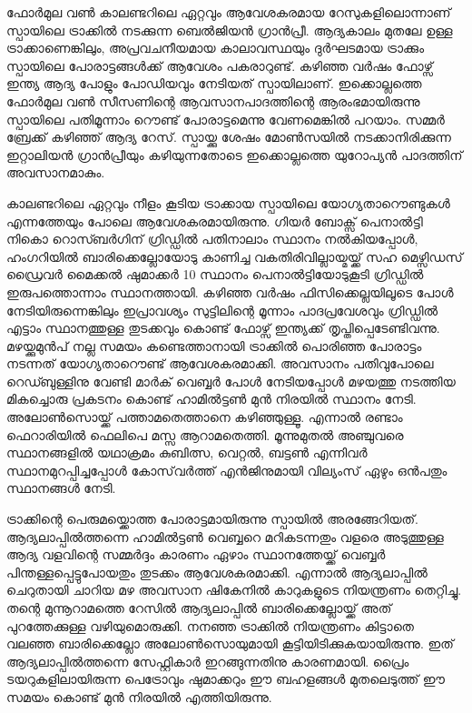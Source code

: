 \vskip 2pt

ഫോര്‍മുല വണ്‍ കാലണ്ടറിലെ ഏറ്റവും ആവേശകരമായ റേസുകളിലൊന്നാണ് സ്പായിലെ ട്രാക്കില്‍ നടക്കുന്ന 
ബെല്‍ജിയന്‍ ഗ്രാന്‍പ്രീ. ആദ്യകാലം മുതലേ ഉള്ള ട്രാക്കാണെങ്കിലും, അപ്രവചനീയമായ കാലാവസ്ഥയും ദുര്‍ഘടമായ 
ട്രാക്കും സ്പായിലെ പോരാട്ടങ്ങള്‍ക്ക് ആവേശം പകരാറുണ്ട്. കഴിഞ്ഞ വര്‍ഷം ഫോഴ്സ് ഇന്ത്യ ആദ്യ പോളും പോഡിയവും 
നേടിയത് സ്പായിലാണ്. ഇക്കൊല്ലത്തെ ഫോര്‍മുല വണ്‍ സീസണിന്റെ ആവസാനപാദത്തിന്റെ ആരംഭമായിരുന്നു 
സ്പായിലെ പതിമൂന്നാം റൌണ്ട് പോരാട്ടമെന്നു വേണമെങ്കില്‍ പറയാം. സമ്മര്‍ ബ്രേക്ക് കഴിഞ്ഞ് ആദ്യ റേസ്. സ്പായ്ക്കു 
ശേഷം മോണ്‍സയില്‍ നടക്കാനിരിക്കുന്ന ഇറ്റാലിയന്‍ ഗ്രാന്‍പ്രീയും കഴിയുന്നതോടെ ഇക്കൊല്ലത്തെ യുറോപ്യന്‍ 
പാദത്തിന് അവസാനമാകും.

കാലണ്ടറിലെ ഏറ്റവും നീളം കൂടിയ ട്രാക്കായ സ്പായിലെ യോഗ്യതാറൌണ്ടുകള്‍ എന്നത്തേയും പോലെ 
ആവേശകരമായിരുന്നു. ഗിയര്‍ ബോക്സ് പെനാല്‍ട്ടി നികൊ റൊസ്ബര്‍ഗിന് ഗ്രിഡ്ഡില്‍ പതിനാലാം സ്ഥാനം 
നല്‍കിയപ്പോള്‍, ഹംഗറിയില്‍ ബാരിക്കെല്ലോയോടു കാണിച്ച വകതിരിവില്ലായ്മയ്ക്ക് സഹ മെഴ്സിഡസ് ഡ്രൈവര്‍ മൈക്കല്‍ 
ഷുമാക്കര്‍ 10 സ്ഥാനം പെനാല്‍ട്ടിയോടുകൂടി ഗ്രിഡ്ഡില്‍ ഇരുപത്തൊന്നാം സ്ഥാനത്തായി. കഴിഞ്ഞ വര്‍ഷം ഫിസിക്കെല്ലയിലൂടെ 
പോള്‍ നേടിയിരുന്നെങ്കിലും ഇപ്രാവശ്യം സുട്ടിലിന്റെ മൂന്നാം പാദപ്രവേശവും ഗ്രിഡ്ഡില്‍ എട്ടാം സ്ഥാനത്തുള്ള തുടക്കവും 
കൊണ്ട് ഫോഴ്സ് ഇന്ത്യക്ക് തൃപ്തിപ്പെടേണ്ടിവന്നു. മഴയ്ക്കുമുന്‍പ് നല്ല സമയം കണ്ടെത്താനായി ട്രാക്കില്‍ പൊരിഞ്ഞ പോരാട്ടം 
നടന്നത് യോഗ്യതാറൌണ്ട് ആവേശകരമാക്കി. അവസാനം പതിവുപോലെ റെഡ്ബുള്ളിനു വേണ്ടി മാര്‍ക് വെബ്ബര്‍ 
പോള്‍ നേടിയപ്പോള്‍ മഴയത്തു നടത്തിയ മികച്ചൊരു പ്രകടനം കൊണ്ട് ഹാമില്‍ട്ടണ്‍ മുന്‍ നിരയില്‍ സ്ഥാനം നേടി. 
അലോണ്‍സൊയ്ക്ക് പത്താമതെത്താനെ കഴിഞ്ഞുള്ളൂ. എന്നാല്‍ രണ്ടാം ഫെറാരിയില്‍ ഫെലിപെ മസ്സ ആറാമതെത്തി. 
മൂന്നുമുതല്‍ അഞ്ചുവരെ സ്ഥാനങ്ങളില്‍ യഥാക്രമം കുബിത്സ, വെറ്റല്‍, ബട്ടണ്‍ എന്നിവര്‍ സ്ഥാനമുറപ്പിച്ചപ്പോള്‍ 
കോസ്‌വര്‍ത്ത് എന്‍ജിനുമായി വില്യംസ് ഏഴും ഒന്‍പതും സ്ഥാനങ്ങള്‍ നേടി.

ട്രാക്കിന്റെ പെരുമയ്ക്കൊത്ത പോരാട്ടമായിരുന്നു സ്പായില്‍ അരങ്ങേറിയത്. ആദ്യലാപ്പില്‍ത്തന്നെ ഹാമില്‍ട്ടണ്‍ വെബ്ബറെ 
മറികടന്നതും വളരെ അടുത്തുള്ള ആദ്യ വളവിന്റെ സമ്മര്‍ദ്ദം കാരണം ഏഴാം സ്ഥാനത്തേയ്ക്ക് വെബ്ബര്‍ 
പിന്തള്ളപ്പെട്ടുപോയതും തുടക്കം ആവേശകരമാക്കി. എന്നാല്‍ ആദ്യലാപ്പില്‍ ചെറുതായി ചാറിയ മഴ അവസാന 
ഷികേനില്‍ കാറുകളുടെ നിയന്ത്രണം തെറ്റിച്ചു. തന്റെ മുന്നൂറാമത്തെ റേസില്‍ ആദ്യലാപ്പില്‍ ബാരിക്കെല്ലോയ്ക്ക് അത് 
പുറത്തേക്കുള്ള വഴിയുമൊരുക്കി. നനഞ്ഞ ട്രാക്കില്‍ നിയന്ത്രണം കിട്ടാതെ വലഞ്ഞ ബാരിക്കെല്ലോ അലോണ്‍സൊയുമായി 
കൂട്ടിയിടിക്കുകയായിരുന്നു. ഇത് ആദ്യലാപ്പില്‍ത്തന്നെ സേഫ്റ്റികാര്‍ ഇറങ്ങുന്നതിനു കാരണമായി. പ്രൈം 
ടയറുകളിലായിരുന്ന പെട്രോവും ഷുമാക്കറും ഈ ബഹളങ്ങള്‍ മുതലെടുത്ത് ഈ സമയം കൊണ്ട് മുന്‍ നിരയില്‍ 
എത്തിയിരുന്നു.

